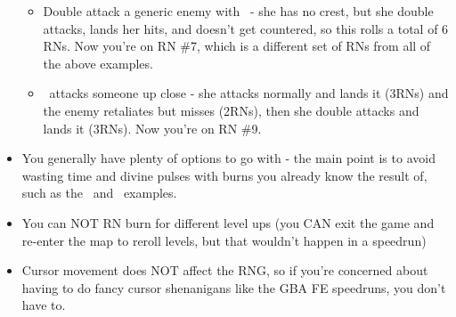 \begin{itemize}
\begin{itemize}
\item Double attack a generic enemy with \Petra\ - she has no crest, but she double attacks, lands her hits, and doesn't get countered, so this rolls a total of 6 RNs. Now you're on RN \#7, which is a different set of RNs from all of the above examples.

\item \Ingrid\ attacks someone up close - she attacks normally and lands it (3RNs) and the enemy retaliates but misses (2RNs), then she double attacks and lands it (3RNs). Now you're on RN \#9.
\end{itemize}
\item You generally have plenty of options to go with - the main point is to avoid wasting time and divine pulses with burns you already know the result of, such as the \Shamir\ and \Hubert\ examples.
\item You can NOT RN burn for different level ups (you CAN exit the game and re-enter the map to reroll levels, but that wouldn't happen in a speedrun)
\item Cursor movement does NOT affect the RNG, so if you're concerned about having to do fancy cursor shenanigans like the GBA FE speedruns, you don't have to.
\end{itemize}